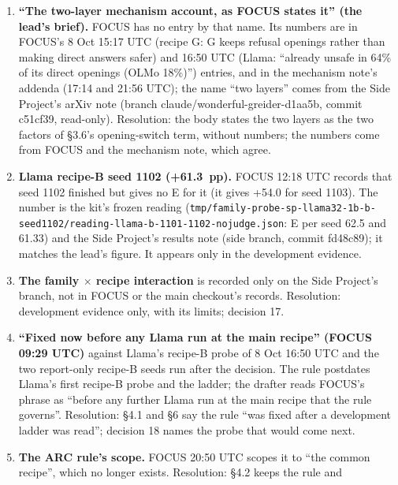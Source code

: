 \documentclass{article}
\theoremstyle{plain}
\theoremstyle{definition}
\theoremstyle{remark}
\begin{document}
\begin{enumerate}
        adds only the too-close rule that FOCUS cites from the frozen amendment.
        \textbf{Superseded (revision 5):} the user decided (FOCUS 9 Oct 09:29
        UTC); [PLACEHOLDER: the common rung] is gone.
  \item \textbf{``The two-layer mechanism account, as FOCUS states it'' (the
        lead's brief).} FOCUS has no entry by that name. Its numbers are in
        FOCUS's 8 Oct 15:17 UTC (recipe G: G keeps refusal openings rather than
        making direct answers safer) and 16:50 UTC (Llama: ``already unsafe in
        64\% of its direct openings (OLMo 18\%)'') entries, and in the mechanism
        note's addenda (17:14 and 21:56 UTC); the name ``two layers'' comes from
        the Side Project's arXiv note (branch claude/wonderful-greider-d1aa5b,
        commit c51cf39, read-only). Resolution: the body states the two layers
        as the two factors of \S{}3.6's opening-switch term, without numbers;
        the numbers come from FOCUS and the mechanism note, which agree.
  \item \textbf{Llama recipe-B seed 1102 (+61.3~pp).} FOCUS 12:18 UTC records
        that seed 1102 finished but gives no E for it (it gives +54.0 for seed
        1103). The number is the kit's frozen reading
        (\nolinkurl{tmp/family-probe-sp-llama32-1b-b-seed1102/reading-llama-b-1101-1102-nojudge.json}:
        E per seed 62.5 and 61.33) and the Side Project's results note (side
        branch, commit fd48c89); it matches the lead's figure. It appears only
        in the development evidence.
  \item \textbf{The family $\times$ recipe interaction} is recorded only on the
        Side Project's branch, not in FOCUS or the main checkout's records.
        Resolution: development evidence only, with its limits; decision 17.
  \item \textbf{``Fixed now before any Llama run at the main recipe'' (FOCUS
        09:29 UTC)} against Llama's recipe-B probe of 8 Oct 16:50 UTC and the
        two report-only recipe-B seeds run after the decision. The rule
        postdates Llama's first recipe-B probe and the ladder; the drafter reads
        FOCUS's phrase as ``before any further Llama run at the main recipe that
        the rule governs''. Resolution: \S{}4.1 and \S{}6 say the rule ``was
        fixed after a development ladder was read''; decision 18 names the probe
        that would come next.
  \item \textbf{The ARC rule's scope.} FOCUS 20:50 UTC scopes it to ``the common
        recipe'', which no longer exists. Resolution: \S{}4.2 keeps the rule and

\end{enumerate}
\end{document}
